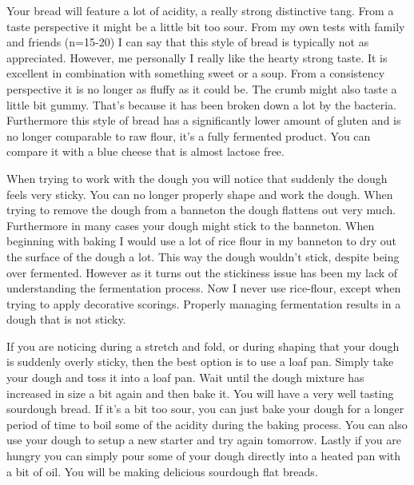 Your bread will feature a lot of acidity, a really strong distinctive tang. From
a taste perspective it might be a little bit too sour. From my own tests with family and
friends (n=15-20) I can say that this style of bread is typically
not as appreciated. However, me personally I really like the hearty strong taste.
It is excellent in combination with something
sweet or a soup.  From a consistency perspective it is no longer as fluffy as it could be.
The crumb might also taste a little bit gummy. That's because it has been broken down a lot
by the bacteria. Furthermore this style of bread has a significantly lower amount of gluten \cite{raffaella+di+cagno}
and is no longer comparable to raw flour, it's a fully fermented product.
You can compare it with a blue cheese that is almost lactose free.

When trying to work with the dough you will notice that suddenly the dough feels
very sticky. You can no longer properly shape and work the dough. When trying to
remove the dough from a banneton the dough flattens out very much. Furthermore
in many cases your dough might stick to the banneton. When beginning with baking
I would use a lot of rice flour in my banneton to dry out the surface of the dough a lot.
This way the dough wouldn't stick, despite being over fermented. However as it
turns out the stickiness issue has been my lack of understanding the fermentation
process. Now I never use rice-flour, except when trying to apply decorative scorings.
Properly managing fermentation results in a dough that is not sticky.

If you are noticing during a stretch and fold, or during shaping that your dough
is suddenly overly sticky, then the best option is to use a loaf pan. Simply take
your dough and toss it into a loaf pan. Wait until the dough mixture has increased
in size a bit again and then bake it. You will have a very well tasting sourdough
bread. If it's a bit too sour, you can just bake your dough for a longer period
of time to boil some of the acidity during the baking process. You can also use
your dough to setup a new starter and try again tomorrow. Lastly if you are hungry
you can simply pour some of your dough directly into a heated pan with a bit of
oil. You will be making delicious sourdough flat breads.

